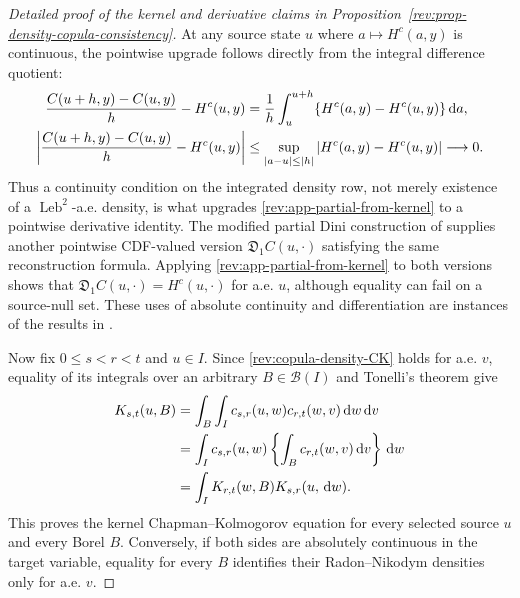 \documentclass[11pt]{article}
\theoremstyle{remark}
\newcommand{\dd}{\,\mathrm d}
\newcommand{\Leb}{\operatorname{Leb}}
\begin{document}
\begin{proof}[Detailed proof of the kernel and derivative claims in
Proposition~\ref{rev:prop-density-copula-consistency}]
At any source state $u$ where $a\mapsto H^c(a,y)$ is continuous, the pointwise
upgrade follows directly from the integral difference quotient:
\begin{align}
\frac{C(u+h,y)-C(u,y)}{h}-H^c(u,y)
&=\frac1h\int_u^{u+h}\{H^c(a,y)-H^c(u,y)\}\dd a,\notag\\
\left|\frac{C(u+h,y)-C(u,y)}{h}-H^c(u,y)\right|
&\le \sup_{|a-u|\le |h|}|H^c(a,y)-H^c(u,y)|
\longrightarrow0.
\label{rev:app-pointwise-partial-upgrade}
\end{align}
Thus a continuity condition on the integrated density row, not merely existence
of a $\Leb^2$-a.e. density, is what upgrades
\eqref{rev:app-partial-from-kernel} to a pointwise derivative identity.  The
modified partial Dini construction of \citet{FangJiangLiuYang2020} supplies
another pointwise CDF-valued version $\mathfrak D_1C(u,\cdot)$ satisfying the
same reconstruction formula.  Applying
\eqref{rev:app-partial-from-kernel} to both versions shows that
$\mathfrak D_1C(u,\cdot)=H^c(u,\cdot)$ for a.e. $u$, although equality can fail
on a source-null set.  These uses of absolute continuity and differentiation
are instances of the results in \citet[Chapter~3]{Folland1999}.

Now fix $0\le s<r<t$ and $u\in I$.  Since
\eqref{rev:copula-density-CK} holds for a.e. $v$, equality of its integrals over
an arbitrary $B\in\mathcal B(I)$ and Tonelli's theorem give
\begin{align}
K_{s,t}(u,B)
&=\int_B\int_Ic_{s,r}(u,w)c_{r,t}(w,v)\dd w\dd v\notag\\
&=\int_Ic_{s,r}(u,w)
       \left\{\int_Bc_{r,t}(w,v)\dd v\right\}\dd w\notag\\
&=\int_IK_{r,t}(w,B)K_{s,r}(u,\dd w).
\label{rev:app-density-to-kernel-CK}
\end{align}
This proves the kernel Chapman--Kolmogorov equation for every selected source
$u$ and every Borel $B$.  Conversely, if both sides are absolutely continuous
in the target variable, equality for every $B$ identifies their
Radon--Nikodym densities only for a.e. $v$.


\end{proof}
\end{document}
